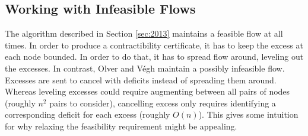 \documentclass[11pt]{article}
\makeatletter
\let\comment\todo
\newcommand{\katie}[1]{\comment[nolist,color=green!40]{@katie\\ #1}}
\theoremstyle{definition}
\theoremstyle{definition}
\theoremstyle{definition}
\renewcommand{\todo}[1]{\hl{TODO: #1}}
\makeatother
\begin{document}
	
	
    

	\subsection{Working with Infeasible Flows}\label{sec:infeasible}
	The algorithm described in Section \ref{sec:2013} maintains a feasible flow
	at all times. In order to produce a contractibility certificate, it has
	to keep the excess at each node bounded. In order to do that, it has to spread
	flow around, leveling out the excesses. In contrast, Olver and V\'egh \cite{Olver2017} maintain
	a possibly infeasible flow. Excesses are sent to cancel with deficits instead of spreading them
	around. Whereas leveling excesses could require augmenting between all pairs of
	nodes (roughly $n^2$ pairs to consider), cancelling excess only requires identifying
	a corresponding deficit for each excess (roughly $O(n)$). This gives some intuition
    for why relaxing the feasibility requirement might be appealing.
	
\end{document}
